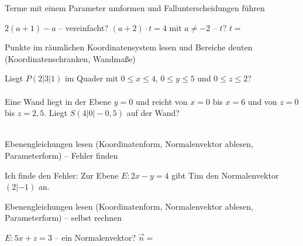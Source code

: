 \begin{aufgabe}{Terme mit einem Parameter umformen und Fallunterscheidungen führen}
\begin{teile}
\teil $2(a + 1) - a$ – vereinfacht? \leerfeld
\teil $(a + 2) \cdot t = 4$ mit $a \neq -2$ – $t$? $t = $ \leerfeld
\end{teile}
\end{aufgabe}

\begin{aufgabe}{Punkte im räumlichen Koordinatensystem lesen und Bereiche deuten (Koordinatenschranken, Wandmaße)}
\begin{teile}
\teil Liegt $P(2 | 3 | 1)$ im Quader mit $0 \le x \le 4$, $0 \le y \le 5$ und $0 \le z \le 2$? \\  \\ 
\teil Eine Wand liegt in der Ebene $y = 0$ und reicht von $x = 0$ bis $x = 6$ und von $z = 0$ bis $z = 2{,}5$. Liegt $S(4 | 0 | -0{,}5)$ auf der Wand? \\  \\ 
\end{teile}
\end{aufgabe}

\begin{aufgabe}{Ebenengleichungen lesen (Koordinatenform, Normalenvektor ablesen, Parameterform) – Fehler finden}
\begin{teile}
\teil Ich finde den Fehler: Zur Ebene $E: 2x - y = 4$ gibt Tim den Normalenvektor $(2 | -1)$ an.
\end{teile}
\end{aufgabe}

\begin{aufgabe}{Ebenengleichungen lesen (Koordinatenform, Normalenvektor ablesen, Parameterform) – selbst rechnen}
\begin{teile}
\teil $E: 5x + z = 3$ – ein Normalenvektor? $\vec{n} = $ \leerfeld
\end{teile}
\end{aufgabe}
